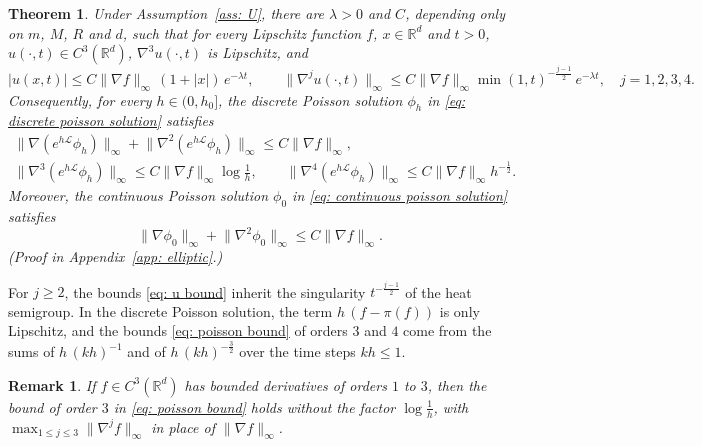\documentclass{article}
\newtheorem{theorem}{Theorem}
\newtheorem{remark}{Remark}
\newcommand{\Le}{\leqslant}
\newcommand{\Ge}{\geqslant}
\newcommand{\norm}[1]{\lVert #1 \rVert}
\numberwithin{equation}{section}
\begin{document}
\begin{theorem}
\label{thm: u decay}
    Under Assumption~\ref{ass: U}, there are $\lambda > 0$ and $C$, depending only on $m$, $M$, $R$ and $d$, such that for every Lipschitz function $f$, $x \in \mathbb R^d$ and $t > 0$, $u(\cdot,t) \in C^3(\mathbb R^d)$, $\nabla^3 u(\cdot,t)$ is Lipschitz, and
    \begin{equation}
        |u(x,t)| \Le C \norm{\nabla f}_\infty\, (1 + |x|)\, e^{-\lambda t} , \qquad
        \norm{\nabla^j u(\cdot,t)}_\infty \Le C \norm{\nabla f}_\infty \min(1,t)^{-\frac{j-1}{2}}\, e^{-\lambda t} , \quad j = 1, 2, 3, 4 .
        \label{eq: u bound}
    \end{equation}
    Consequently, for every $h \in (0,h_0]$, the discrete Poisson solution $\phi_h$ in \eqref{eq: discrete poisson solution} satisfies
    \begin{equation}
    	\begin{gathered}
        \norm{\nabla ( e^{h\mathcal L} \phi_h )}_\infty + \norm{\nabla^2 ( e^{h\mathcal L} \phi_h )}_\infty \Le C \norm{\nabla f}_\infty ,\\
        \norm{\nabla^3 ( e^{h\mathcal L} \phi_h )}_\infty \Le C \norm{\nabla f}_\infty \log\frac1h , \qquad
        \norm{\nabla^4 ( e^{h\mathcal L} \phi_h )}_\infty \Le C \norm{\nabla f}_\infty h^{-\frac12} .
        \end{gathered}
        \label{eq: poisson bound}
    \end{equation}
    Moreover, the continuous Poisson solution $\phi_0$ in \eqref{eq: continuous poisson solution} satisfies
    \begin{equation}
    	\norm{\nabla \phi_0}_\infty + \norm{\nabla^2 \phi_0}_\infty \Le C \norm{\nabla f}_\infty .
    	\label{eq: continuous poisson bound}
    \end{equation}
    \emph{(Proof in Appendix~\ref{app: elliptic}.)}
\end{theorem}

For $j \Ge 2$, the bounds \eqref{eq: u bound} inherit the singularity $t^{-\frac{j-1}{2}}$ of the heat semigroup. In the discrete Poisson solution, the term $h\, ( f - \pi(f) )$ is only Lipschitz, and the bounds \eqref{eq: poisson bound} of orders $3$ and $4$ come from the sums of $h\, (kh)^{-1}$ and of $h\, (kh)^{-\frac32}$ over the time steps $kh \Le 1$.

\begin{remark}
\label{rem: regular}
If $f \in C^3(\mathbb R^d)$ has bounded derivatives of orders $1$ to $3$, then the bound of order $3$ in \eqref{eq: poisson bound} holds without the factor $\log\frac1h$, with $\max_{1 \Le j \Le 3} \norm{\nabla^j f}_\infty$ in place of $\norm{\nabla f}_\infty$.
\end{remark}
\end{document}
